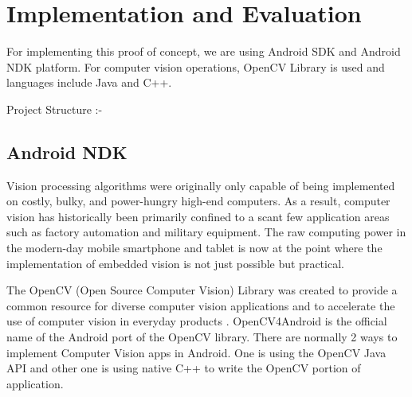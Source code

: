 \section{Implementation and Evaluation}

For implementing this proof of concept, we are using Android SDK and Android NDK platform. For computer vision operations, OpenCV Library is used and languages include Java and C++. 

Project Structure :-

\begin{figure}
    \centering\small
    \begin{minipage}[t]{\linewidth}
    \end{minipage}
\end{figure}

\subsection{Android NDK}

Vision processing algorithms were originally only capable of being implemented on costly, bulky, and power-hungry high-end computers. As a result, computer vision has historically been primarily confined to a scant few application areas such as factory automation and military equipment. The raw computing power in the modern-day mobile smartphone and tablet is now at the point where the implementation of embedded vision is not just possible but practical.

The OpenCV (Open Source Computer Vision) Library was created to provide a common resource for diverse computer vision applications and to accelerate the use of computer vision in everyday products \cite{lane5}. OpenCV4Android is the official name of the Android port of the OpenCV library. There are normally 2 ways to implement Computer Vision apps in Android. One is using the OpenCV Java API and other one is using native C++ to write the OpenCV portion of application. 

